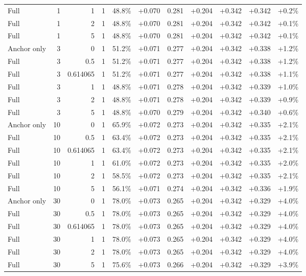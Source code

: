 \begin{table}[htbp]
\begin{tabular}{lrrrccccccc}
Full & 1 & 1 & 1 & 48.8\% & +0.070 & 0.281 & +0.204 & +0.342 & +0.342 & +0.2\% \\
Full & 1 & 2 & 1 & 48.8\% & +0.070 & 0.281 & +0.204 & +0.342 & +0.342 & +0.1\% \\
Full & 1 & 5 & 1 & 48.8\% & +0.070 & 0.281 & +0.204 & +0.342 & +0.342 & +0.1\% \\
Anchor only & 3 & 0 & 1 & 51.2\% & +0.071 & 0.277 & +0.204 & +0.342 & +0.338 & +1.2\% \\
Full & 3 & 0.5 & 1 & 51.2\% & +0.071 & 0.277 & +0.204 & +0.342 & +0.338 & +1.2\% \\
Full & 3 & 0.614065 & 1 & 51.2\% & +0.071 & 0.277 & +0.204 & +0.342 & +0.338 & +1.1\% \\
Full & 3 & 1 & 1 & 48.8\% & +0.071 & 0.278 & +0.204 & +0.342 & +0.339 & +1.0\% \\
Full & 3 & 2 & 1 & 48.8\% & +0.071 & 0.278 & +0.204 & +0.342 & +0.339 & +0.9\% \\
Full & 3 & 5 & 1 & 48.8\% & +0.070 & 0.279 & +0.204 & +0.342 & +0.340 & +0.6\% \\
Anchor only & 10 & 0 & 1 & 65.9\% & +0.072 & 0.273 & +0.204 & +0.342 & +0.335 & +2.1\% \\
Full & 10 & 0.5 & 1 & 63.4\% & +0.072 & 0.273 & +0.204 & +0.342 & +0.335 & +2.1\% \\
Full & 10 & 0.614065 & 1 & 63.4\% & +0.072 & 0.273 & +0.204 & +0.342 & +0.335 & +2.1\% \\
Full & 10 & 1 & 1 & 61.0\% & +0.072 & 0.273 & +0.204 & +0.342 & +0.335 & +2.0\% \\
Full & 10 & 2 & 1 & 58.5\% & +0.072 & 0.273 & +0.204 & +0.342 & +0.335 & +2.1\% \\
Full & 10 & 5 & 1 & 56.1\% & +0.071 & 0.274 & +0.204 & +0.342 & +0.336 & +1.9\% \\
Anchor only & 30 & 0 & 1 & 78.0\% & +0.073 & 0.265 & +0.204 & +0.342 & +0.329 & +4.0\% \\
Full & 30 & 0.5 & 1 & 78.0\% & +0.073 & 0.265 & +0.204 & +0.342 & +0.329 & +4.0\% \\
Full & 30 & 0.614065 & 1 & 78.0\% & +0.073 & 0.265 & +0.204 & +0.342 & +0.329 & +4.0\% \\
Full & 30 & 1 & 1 & 78.0\% & +0.073 & 0.265 & +0.204 & +0.342 & +0.329 & +4.0\% \\
Full & 30 & 2 & 1 & 78.0\% & +0.073 & 0.265 & +0.204 & +0.342 & +0.329 & +4.0\% \\
Full & 30 & 5 & 1 & 75.6\% & +0.073 & 0.266 & +0.204 & +0.342 & +0.329 & +3.9\% \\

\end{tabular}
\end{table}
